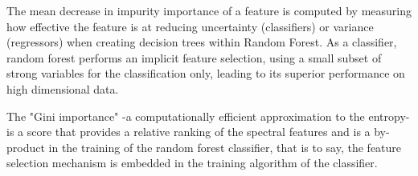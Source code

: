 \documentclass[preprint,12pt]{elsarticle}
\begin{document}
%


The mean decrease in impurity importance of a feature is computed by measuring how effective the feature is at reducing uncertainty (classifiers) or variance (regressors) when creating decision trees within Random Forest. As a classifier, random forest performs an implicit feature selection, using a small subset of strong variables for the classification only, leading to its superior performance on high dimensional data. 
%

The "Gini importance" -a computationally efficient approximation to the entropy- is a score that provides a relative ranking of the spectral features and is a by-product in the training of the random forest classifier, that is to say, the feature selection mechanism is embedded in the training algorithm of the classifier.
\end{document}
